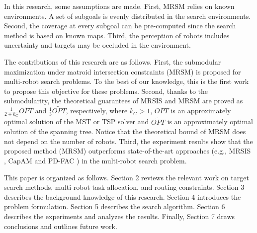 In this research, some assumptions are made. First, MRSM relies on known environments. A set of subgoals is evenly distributed in the search environments.
Second, the coverage at every subgoal can be pre-computed since the search method is based on known maps.
Third, the perception of robots includes uncertainty and targets may be occluded in the environment.

The contributions of this research are as follows.
First,  the submodular maximization under matroid intersection constraints (MRSM) is proposed for multi-robot search problems.
To the best of our knowledge, this is the first work to propose this objective for these problems.
Second, thanks to the submodularity,
the theoretical guarantees of MRSIS \cite{li2024mrsis} and MRSM are proved as $\frac{1}{2+k_G} \overline{OPT}$ and $\frac{1}{3}\widetilde{OPT}$, respectively, where $k_G > 1$, $\overline{OPT}$ is an approximately optimal solution of the MST or TSP solver and $\widetilde{OPT}$ is an approximately optimal solution of the spanning tree.
Notice that the theoretical bound of MRSM does not depend on the number of robots.
Third, the experiment results show that the proposed method (MRSM) outperforms state-of-the-art approaches (e.g., MRSIS \cite{li2024mrsis}, CapAM \cite{paull2022learning} and PD-FAC \cite{sheng2022pd}) in the multi-robot search problem.

This paper is organized as follows. Section 2 reviews the relevant work on target search methods, multi-robot task allocation, and routing constraints. Section 3 describes the background knowledge of this research. Section 4 introduces the problem formulation. Section 5 describes the search algorithm. Section 6 describes the experiments and analyzes the results. Finally, Section 7 draws conclusions and outlines future work.


